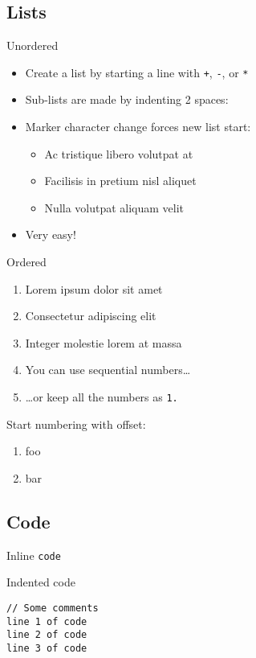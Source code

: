 \documentclass[]{article}
\providecommand{\tightlist}{%
  \setlength{\itemsep}{0pt}\setlength{\parskip}{0pt}}
\begin{document}
\subsection{Lists}

Unordered

\begin{itemize}
\tightlist
\item
  Create a list by starting a line with \texttt{+}, \texttt{-}, or
  \texttt{*}
\item
  Sub-lists are made by indenting 2 spaces:
\item
  Marker character change forces new list start:

  \begin{itemize}
  \tightlist
  \item
    Ac tristique libero volutpat at
  \item
    Facilisis in pretium nisl aliquet
  \item
    Nulla volutpat aliquam velit
  \end{itemize}
\item
  Very easy!
\end{itemize}

Ordered

\begin{enumerate}
\item
  Lorem ipsum dolor sit amet
\item
  Consectetur adipiscing elit
\item
  Integer molestie lorem at massa
\item
  You can use sequential numbers\ldots{}
\item
  \ldots{}or keep all the numbers as \texttt{1.}
\end{enumerate}

Start numbering with offset:

\begin{enumerate}
\tightlist
\item
  foo
\item
  bar
\end{enumerate}

\subsection{Code}

Inline \texttt{code}

Indented code

\begin{verbatim}
// Some comments
line 1 of code
line 2 of code
line 3 of code
\end{verbatim}
\end{document}
